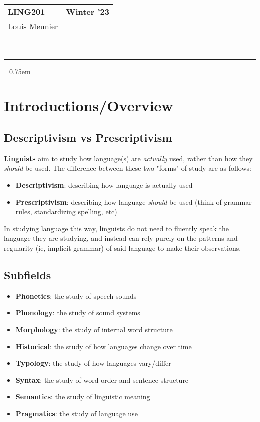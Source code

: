 \documentclass[12pt]{article}
\begin{document}
\noindent
\begin{center}
    \begin{tabularx}{\textwidth} { 
        >{\raggedright\arraybackslash}X 
        >{\raggedleft\arraybackslash}X}
    \LARGE \textbf{LING201} & \LARGE \textbf{Winter 
    '23}\\
    \LARGE Louis Meunier \\
    \end{tabularx}\\
    \rule[2ex]{0.9\textwidth}{1pt}
\end{center}
\parskip=0.75em

{
  \hypersetup{linkcolor=violet}
  \tableofcontents
}

\newpage
\section{Introductions/Overview}

\subsection{Descriptivism vs Prescriptivism}

\textbf{Linguists} aim to study how language(s) are \textit{actually} used, rather than how they \textit{should} be used. The difference between these two "forms" of study are as follows:

\begin{itemize}
  \item \textbf{Descriptivism}: describing how language is actually used
  \item \textbf{Prescriptivism}: describing how language \textit{should} be used (think of grammar rules, standardizing spelling, etc)
\end{itemize}

In studying language this way, linguists do not need to fluently speak the language they are studying, and instead can rely purely on the patterns and regularity (ie, implicit grammar) of said language to make their observations.

\subsection{Subfields}

\begin{itemize}
  \item \textbf{Phonetics}: the study of speech sounds
  \item \textbf{Phonology}: the study of sound systems
  \item \textbf{Morphology}: the study of internal word structure
  \item \textbf{Historical}: the study of how languages change over time
  \item \textbf{Typology}: the study of how languages vary/differ
  \item \textbf{Syntax}: the study of word order and sentence structure
  \item \textbf{Semantics}: the study of linguistic meaning
  \item \textbf{Pragmatics}: the study of language use
\end{itemize}
\end{document}
